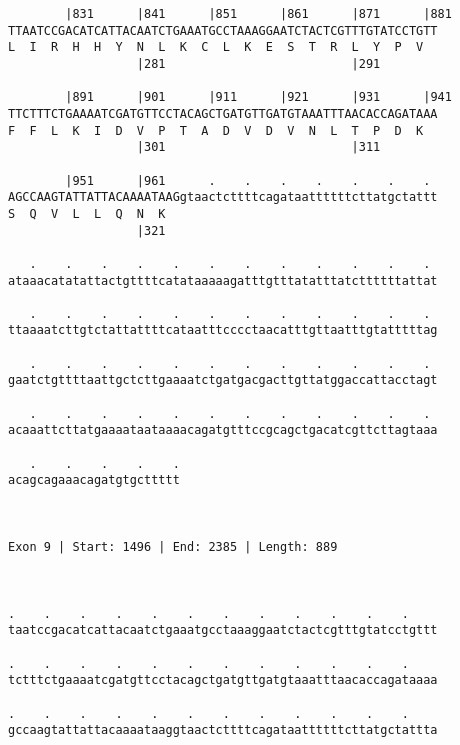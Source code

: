 \documentclass{article}
\begin{document}
\begin{Verbatim}
        |831      |841      |851      |861      |871      |881
TTAATCCGACATCATTACAATCTGAAATGCCTAAAGGAATCTACTCGTTTGTATCCTGTT
L  I  R  H  H  Y  N  L  K  C  L  K  E  S  T  R  L  Y  P  V  
                  |281                          |291        
  
        |891      |901      |911      |921      |931      |941
TTCTTTCTGAAAATCGATGTTCCTACAGCTGATGTTGATGTAAATTTAACACCAGATAAA
F  F  L  K  I  D  V  P  T  A  D  V  D  V  N  L  T  P  D  K  
                  |301                          |311        
  
        |951      |961      .    .    .    .    .    .    . 
AGCCAAGTATTATTACAAAATAAGgtaactcttttcagataattttttcttatgctattt
S  Q  V  L  L  Q  N  K                                      
                  |321                                      
  
   .    .    .    .    .    .    .    .    .    .    .    . 
ataaacatatattactgttttcatataaaaagatttgtttatatttatcttttttattat
                                                            
   .    .    .    .    .    .    .    .    .    .    .    . 
ttaaaatcttgtctattattttcataatttcccctaacatttgttaatttgtatttttag
                                                            
   .    .    .    .    .    .    .    .    .    .    .    . 
gaatctgttttaattgctcttgaaaatctgatgacgacttgttatggaccattacctagt
                                                            
   .    .    .    .    .    .    .    .    .    .    .    . 
acaaattcttatgaaaataataaaacagatgtttccgcagctgacatcgttcttagtaaa
                                                            
   .    .    .    .    .
acagcagaaacagatgtgcttttt
                        
                        
 
Exon 9 | Start: 1496 | End: 2385 | Length: 889



.    .    .    .    .    .    .    .    .    .    .    .    
taatccgacatcattacaatctgaaatgcctaaaggaatctactcgtttgtatcctgttt
                                                            
.    .    .    .    .    .    .    .    .    .    .    .    
tctttctgaaaatcgatgttcctacagctgatgttgatgtaaatttaacaccagataaaa
                                                            
.    .    .    .    .    .    .    .    .    .    .    .    
gccaagtattattacaaaataaggtaactcttttcagataattttttcttatgctattta
                                                            

\end{Verbatim}
\end{document}
